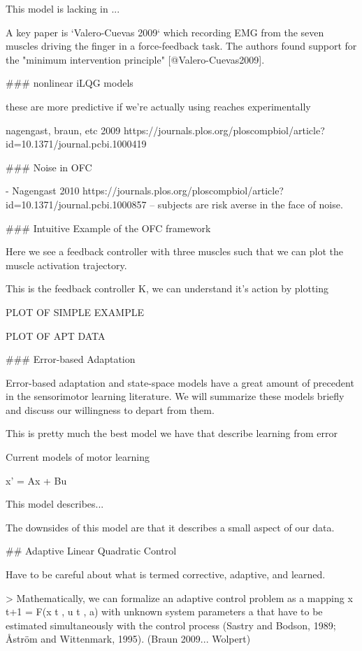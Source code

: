 \documentclass[../main.tex]{subfiles}
\begin{document}
{{{This model is lacking in ... 

A key paper is `Valero-Cuevas 2009` which recording EMG from the seven muscles driving the finger in a force-feedback task. The authors found support for the "minimum intervention principle" [@Valero-Cuevas2009].

### nonlinear iLQG models

these are more predictive if we're actually using reaches experimentally

nagengast, braun, etc 2009
https://journals.plos.org/ploscompbiol/article?id=10.1371/journal.pcbi.1000419


### Noise in OFC

- Nagengast 2010 https://journals.plos.org/ploscompbiol/article?id=10.1371/journal.pcbi.1000857 -- subjects are risk averse in the face of noise. 




### Intuitive Example of the OFC framework

Here we see a feedback controller with three muscles such that we can plot the muscle activation trajectory.

This is the feedback controller K, we can understand it's action by plotting 

PLOT OF SIMPLE EXAMPLE 

PLOT OF APT DATA


### Error-based Adaptation

Error-based adaptation and state-space models have a great amount of precedent in the sensorimotor learning literature. We will summarize these models briefly and discuss our willingness to depart from them.

This is pretty much the best model we have that describe learning from error

Current models of motor learning 

x' = Ax + Bu 

This model describes...

The downsides of this model are that it describes a small aspect of our data.





## Adaptive Linear Quadratic Control

Have to be careful about what is termed corrective, adaptive, and learned.

> Mathematically, we can formalize an adaptive control problem as a mapping x t+1 = F(x t , u t , a) with unknown system parameters a that have to be estimated simultaneously with the control process (Sastry and Bodson, 1989; Åström and Wittenmark, 1995). (Braun 2009... Wolpert) 

}}}
\end{document}
